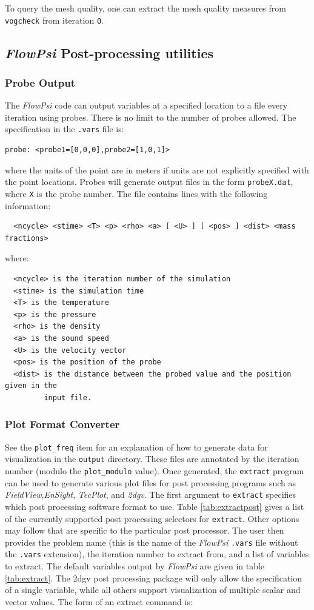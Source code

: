\documentclass{article}
\begin{document}
To query the mesh quality, one can extract the mesh quality measures
from {\tt vogcheck} from iteration {\tt 0}.


\subsection{{\em FlowPsi} Post-processing utilities}

\subsubsection{Probe Output}

The {\em FlowPsi} code can output variables at a specified location to a file every
iteration using probes.  There is no limit to the number of probes allowed.
The specification in the {\tt .vars} file is:
\begin{verbatim}
probe: <probe1=[0,0,0],probe2=[1,0,1]>
\end{verbatim}
where the units of the point are in meters if units are not explicitly
specified with the point locations.  Probes will generate output files
in the form {\tt probeX.dat}, where {\tt X} is the probe number.
The file contains lines with the following information:
\begin{verbatim}
  <ncycle> <stime> <T> <p> <rho> <a> [ <U> ] [ <pos> ] <dist> <mass fractions>
\end{verbatim}
where:
\begin{verbatim}
  <ncycle> is the iteration number of the simulation
  <stime> is the simulation time
  <T> is the temperature
  <p> is the pressure
  <rho> is the density
  <a> is the sound speed
  <U> is the velocity vector
  <pos> is the position of the probe
  <dist> is the distance between the probed value and the position given in the
         input file.
\end{verbatim}

\subsubsection{Plot Format Converter}
\label{sec:converter}
See the {\tt plot\_freq} item for an explanation of how to generate data
for visualization in the {\tt output} directory.  These files are annotated by the
iteration number (modulo the {\tt plot\_modulo} value).  Once generated, the
{\tt extract} program can be used to generate various plot files for post
processing programs such as {\it FieldView},{\it EnSight}, {\it
TecPlot}, and {\it 2dgv}.  The first argument to {\tt extract} specifies
which post processing software format to use.
Table \ref{tab:extractpost} gives a list of the
currently supported post processing selectors for {\tt extract}.  Other
options may follow that are specific to the particular post processor.
The user then provides the problem name (this is the name of the {\em FlowPsi}
{\tt .vars} file without the {\tt .vars} extension),
the iteration number to extract from, and
a list of variables to extract.  The default variables output by {\em FlowPsi}
are given in table \ref{tab:extract}.  The 2dgv post processing
package will only allow the specification of a single variable, while
all others support visualization of multiple scalar and vector values.
The form of an extract command is:
\end{document}
